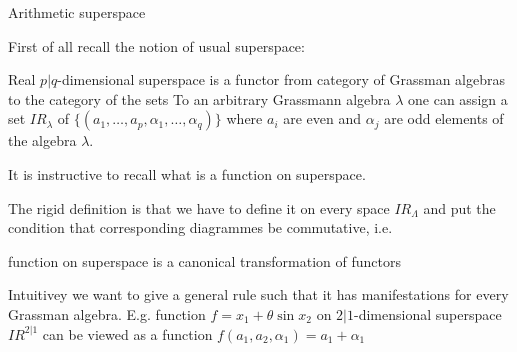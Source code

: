 
\def\L {\lambda}
\def\R {{I\!\!R}}
\def\a {\alpha}
           {Arithmetic superspace}

  First of all recall the notion of usual superspace:

    Real $p|q$-dimensional superspace is a functor from category of
    Grassman algebras to the category of the sets
To an arbitrary Grassmann algebra $\L$ one can assign
a set $\R_\L$ of
$\{(a_1,\dots,a_p,\a_1,\dots,\a_q)\}$
where $a_i$ are even and $\a_j$ are odd elements of the algebra $\L$.

 It is instructive to recall what is a function on superspace.

 The rigid definition is that we have to define it on every space $\R_\Lambda$
 and put the condition that corresponding diagrammes be commutative, i.e.

   \centerline {function on superspace is a canonical transformation of functors}


 Intuitivey we want to give a general rule such that it has manifestations for every Grassman
 algebra. E.g. function $f=x_1+\theta\sin x_2$ on $2|1$-dimensional superspace  $\R^{2|1}$
 can be viewed as a function $f(a_1,a_2,\a_1)=a_1+\a_1$



    \bye
